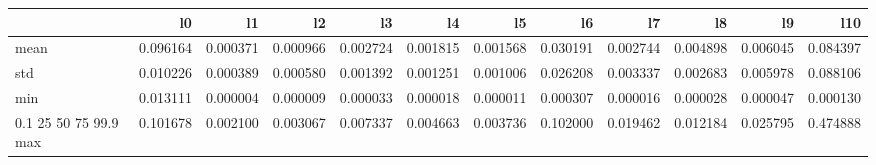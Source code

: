 \begin{tabular}{lrrrrrrrrrrr}
\toprule
 & l0 & l1 & l2 & l3 & l4 & l5 & l6 & l7 & l8 & l9 & l10 \\
\midrule
mean & 0.096164 & 0.000371 & 0.000966 & 0.002724 & 0.001815 & 0.001568 & 0.030191 & 0.002744 & 0.004898 & 0.006045 & 0.084397 \\
std & 0.010226 & 0.000389 & 0.000580 & 0.001392 & 0.001251 & 0.001006 & 0.026208 & 0.003337 & 0.002683 & 0.005978 & 0.088106 \\
min & 0.013111 & 0.000004 & 0.000009 & 0.000033 & 0.000018 & 0.000011 & 0.000307 & 0.000016 & 0.000028 & 0.000047 & 0.000130 \\
0.1%
25%
50%
75%
99.9%
max & 0.101678 & 0.002100 & 0.003067 & 0.007337 & 0.004663 & 0.003736 & 0.102000 & 0.019462 & 0.012184 & 0.025795 & 0.474888 \\
\bottomrule
\end{tabular}
